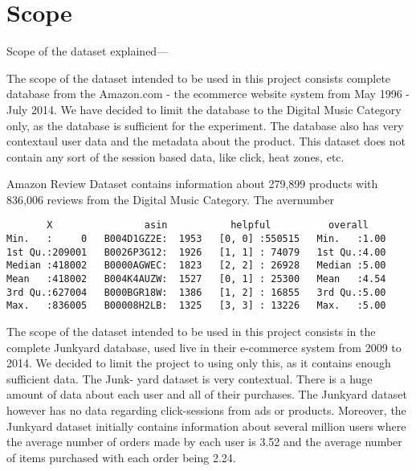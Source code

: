 \section{Scope}

Scope of the dataset explained---

The scope of the dataset intended to be used in this project consists complete database from the Amazon.com - the ecommerce website system from May 1996 - July 2014. We have decided to limit the database to the Digital Music Category only, as the database is sufficient for the experiment. The database also has very contextaul user data and the metadata about the product. This dataset does not contain any sort of the session based data, like click, heat zones, etc.

Amazon Review Dataset contains information about 279,899 products with 836,006 reviews from the Digital Music Category.
The avernumber    


\begin{verbatim}
       X                asin           helpful          overall    
Min.   :     0   B004D1GZ2E:  1953   [0, 0] :550515   Min.   :1.00  
1st Qu.:209001   B0026P3G12:  1926   [1, 1] : 74079   1st Qu.:4.00  
Median :418002   B0000AGWEC:  1823   [2, 2] : 26928   Median :5.00  
Mean   :418002   B004K4AUZW:  1527   [0, 1] : 25300   Mean   :4.54  
3rd Qu.:627004   B000BGR18W:  1386   [1, 2] : 16855   3rd Qu.:5.00  
Max.   :836005   B00008H2LB:  1325   [3, 3] : 13226   Max.   :5.00  
\end{verbatim}





The scope of the dataset intended to be used in this project consists in the complete
Junkyard database, used live in their e-commerce system from 2009 to 2014. We decided
to limit the project to using only this, as it contains enough sufficient data. The Junk-
yard dataset is very contextual. There is a huge amount of data about each user and all
of their purchases. The Junkyard dataset however has no data regarding click-sessions
from ads or products.
Moreover, the Junkyard dataset initially contains information about several million users
where the average number of orders made by each user is 3.52 and the average number
of items purchased with each order being 2.24.


